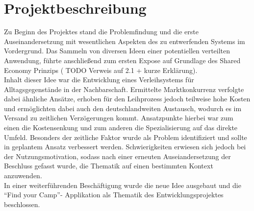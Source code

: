 
\chapter{Projektbeschreibung}

Zu Beginn des Projektes stand die Problemfindung und die erste Auseinandersetzung mit wesentlichen Aspekten des zu entwerfenden Systems im Vordergrund. Das Sammeln von diversen Ideen einer potentiellen verteilten Anwendung, führte anschließend zum ersten Expose auf Grundlage des Shared Economy Prinzips ( TODO Verweis auf 2.1 + kurze Erklärung).\\
Inhalt dieser Idee war die Entwicklung eines Verleihsystems für Alltagsgegenstände in der Nachbarschaft. Ermittelte Marktkonkurrenz verfolgte dabei ähnliche Ansätze, erhoben für den Leihprozess jedoch teilweise hohe Kosten und ermöglichten dabei auch den deutschlandweiten Austausch, wodurch es im Versand zu zeitlichen Verzögerungen kommt.
Ansatzpunkte hierbei war zum einen die Kostensenkung und zum anderen die Spezialisierung auf das direkte Umfeld. Besonders der zeitliche Faktor wurde als Problem identifiziert und sollte in geplantem Ansatz verbessert werden. Schwierigkeiten erwiesen sich jedoch bei der Nutzungsmotivation, sodass nach einer erneuten Auseiandersetzung der Beschluss gefasst wurde, die Thematik auf einen bestimmten Kontext anzuwenden.\\   
In einer weiterführenden Beschäftigung wurde die neue Idee ausgebaut und die “Find your Camp”- Applikation als Thematik des Entwicklungsprojektes beschlossen. 



\newpage



\newpage



\newpage



\newpage




